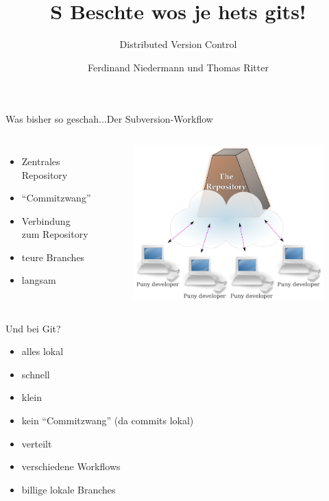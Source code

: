 \documentclass{beamer}
\author{Ferdinand Niedermann und Thomas Ritter}
\title{S Beschte wos je hets \textbf{git}s!}
\subtitle{Distributed Version Control}
\begin{document}
\begin{frame}
 \maketitle
\end{frame}



\begin{frame}{Was bisher so geschah...}{Der Subversion-Workflow}

  \begin{columns}

      \begin{itemize}[<+->]
    	\item Zentrales Repository
	\item ``Commitzwang''
	\item Verbindung zum Repository
	\item teure Branches
	\item langsam
      \end{itemize}

      \begin{figure}
       \includegraphics[width=1\textwidth]{./images/holy-repo.png}
      \end{figure}

  \end{columns}
\end{frame}

\begin{frame}[<+->]{Und bei Git?}{}
  \begin{itemize}
    \item alles lokal
    \item schnell
    \item klein
    \item kein ``Commitzwang'' (da commits lokal)
    \item verteilt
    \item verschiedene Workflows
    \item billige lokale Branches
  \end{itemize}
\end{frame}
\end{document}
